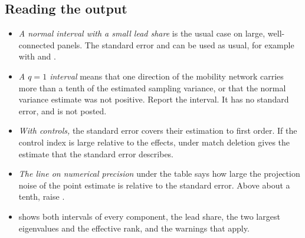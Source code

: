 \subsection{Reading the output}
\begin{itemize}
\item \emph{A normal interval with a small lead share} is the usual case on large,
well-connected panels. The standard error and  can be used as usual, for
example with  and .
\item \emph{A $q=1$ interval} means that one direction of the mobility network carries
more than a tenth of the estimated sampling variance, or that the normal variance
estimate was not positive. Report the interval. It has no standard
error, and  is not posted.
\item \emph{With controls,} the standard error covers their estimation to first order.
If the control index is large relative to the effects, 
under match deletion gives the estimate that the standard error describes.
\item \emph{The line on numerical precision} under the table says how large the
projection noise of the point estimate is relative to the standard error. Above about
a tenth, raise .
\item \emph{} shows both intervals of every component, the lead
share, the two largest eigenvalues and the effective rank, and the warnings that
apply.
\end{itemize}
